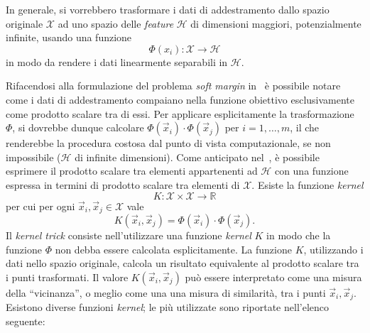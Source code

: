 In generale, si vorrebbero trasformare i dati di addestramento dallo spazio originale $\mathcal{X}$ ad uno spazio delle \emph{feature} $\mathcal{H}$ di dimensioni maggiori, potenzialmente infinite, usando una funzione
\begin{equation}
\label{eq:generic_kernel_mapping}
\Phi(x_i) : \mathcal{X} \rightarrow \mathcal{H}
\end{equation}
in modo da rendere i dati linearmente separabili in $\mathcal{H}$.


Rifacendosi alla formulazione del problema \emph{soft margin} in~ è possibile notare come i dati di addestramento compaiano nella funzione obiettivo esclusivamente come prodotto scalare tra di essi. 
Per applicare esplicitamente la trasformazione $\Phi$, si dovrebbe dunque calcolare $\Phi(\Vec{x}_i)\cdot\Phi(\Vec{x}_j)$ per $i=1,\dots,m$, il che renderebbe la procedura costosa dal punto di vista computazionale, se non impossibile ($\mathcal{H}$ di infinite dimensioni). 
Come anticipato nel~, è possibile esprimere il prodotto scalare tra elementi appartenenti ad $\mathcal{H}$ con una funzione espressa in termini di prodotto scalare tra elementi di $\mathcal{X}$. 
Esiste la funzione \emph{kernel}
\begin{equation*}
    K: \mathcal{X} \times \mathcal{X} \rightarrow \mathbb{R} 
\end{equation*}
per cui per ogni $\Vec{x}_i, \Vec{x}_j \in \mathcal{X}$ vale
\begin{equation*}
    K(\Vec{x}_i, \Vec{x}_j) = \Phi(\Vec{x}_i) \cdot \Phi(\Vec{x}_j).
\end{equation*}
Il \emph{kernel trick} consiste nell'utilizzare una funzione \emph{kernel} $K$ in modo che la funzione $\Phi$ non debba essere calcolata esplicitamente. 
La funzione $K$, utilizzando i dati nello spazio originale, calcola un risultato equivalente al prodotto scalare tra i punti trasformati. 
Il valore $K(\Vec{x}_i, \Vec{x}_j)$ può essere interpretato come una misura della ``vicinanza'', o meglio come una una misura di similarità, tra i punti $\Vec{x}_i, \Vec{x}_j$.
Esistono diverse funzioni \emph{kernel}; le più utilizzate sono riportate nell'elenco seguente:
